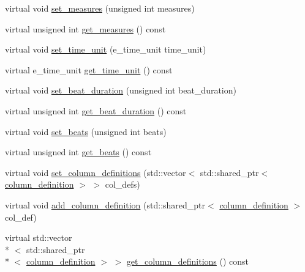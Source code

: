 \begin{DoxyCompactItemize}
\item 
virtual void \hyperlink{classmae_1_1fl_1_1laban_1_1laban__sequence_ae943fe069a5378f668d966a10e8c2dc0}{set\-\_\-measures} (unsigned int measures)
\item 
virtual unsigned int \hyperlink{classmae_1_1fl_1_1laban_1_1laban__sequence_afc622c3261fc32decafd54f76f99c6c9}{get\-\_\-measures} () const 
\item 
virtual void \hyperlink{classmae_1_1fl_1_1laban_1_1laban__sequence_a407b4410ff6f7d825186c14a2c1bbb67}{set\-\_\-time\-\_\-unit} (e\-\_\-time\-\_\-unit time\-\_\-unit)
\item 
virtual e\-\_\-time\-\_\-unit \hyperlink{classmae_1_1fl_1_1laban_1_1laban__sequence_a743a868b1e0d94ab82825cd44ecc7023}{get\-\_\-time\-\_\-unit} () const 
\item 
virtual void \hyperlink{classmae_1_1fl_1_1laban_1_1laban__sequence_a9faabade46dfd30aa8a92f43410d3b01}{set\-\_\-beat\-\_\-duration} (unsigned int beat\-\_\-duration)
\item 
virtual unsigned int \hyperlink{classmae_1_1fl_1_1laban_1_1laban__sequence_a2908186a342d409322b4fc7c4e0fd422}{get\-\_\-beat\-\_\-duration} () const 
\item 
virtual void \hyperlink{classmae_1_1fl_1_1laban_1_1laban__sequence_ab54f507b6f31f92939493f2a2025c388}{set\-\_\-beats} (unsigned int beats)
\item 
virtual unsigned int \hyperlink{classmae_1_1fl_1_1laban_1_1laban__sequence_a5c2d0441c972ce584c3b07252af391ed}{get\-\_\-beats} () const 
\item 
virtual void \hyperlink{classmae_1_1fl_1_1laban_1_1laban__sequence_a55cb7a728085a4b8107ef5eac7bd698a}{set\-\_\-column\-\_\-definitions} (std\-::vector$<$ std\-::shared\-\_\-ptr$<$ \hyperlink{classmae_1_1fl_1_1laban_1_1column__definition}{column\-\_\-definition} $>$ $>$ col\-\_\-defs)
\item 
virtual void \hyperlink{classmae_1_1fl_1_1laban_1_1laban__sequence_a887fe8dfdc6cbed7ddb1734969e52a8f}{add\-\_\-column\-\_\-definition} (std\-::shared\-\_\-ptr$<$ \hyperlink{classmae_1_1fl_1_1laban_1_1column__definition}{column\-\_\-definition} $>$ col\-\_\-def)
\item 
virtual std\-::vector\\*
$<$ std\-::shared\-\_\-ptr\\*
$<$ \hyperlink{classmae_1_1fl_1_1laban_1_1column__definition}{column\-\_\-definition} $>$ $>$ \hyperlink{classmae_1_1fl_1_1laban_1_1laban__sequence_ab1a1d9f6a26582641a4992e1f0cd3d16}{get\-\_\-column\-\_\-definitions} () const 

\end{DoxyCompactItemize}
